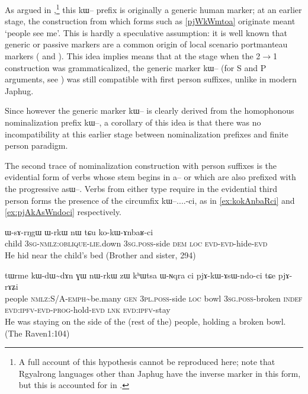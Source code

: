 \documentclass[oldfontcommands,oneside,a4paper,11pt]{article}
\newcommand{\ipa}[1]{{\phon #1}} %
\begin{document}
As argued in \citet{jacques15generic},\footnote{A full account of this hypothesis cannot be reproduced here; note that Rgyalrong languages other than Japhug have the inverse marker in this form, but this is accounted for in \citet{jacques15generic}. } this  \ipa{kɯ--} prefix is originally a generic human marker; at an earlier stage, the construction from which forms such as \ref{pjWkWmtoa} originate meant `people see me'. This is hardly a speculative assumption: it is well known that generic or passive markers are a common origin of local scenario portmanteau markers (\citealt{heath98skewing} and  \citealt{delancey15sociopragmatic}). This idea implies means that at the stage when the 2$\rightarrow$1 construction was grammaticalized,  the generic marker \ipa{kɯ--} (for S and P arguments, see \citealt{jacques12demotion}) was still compatible with first person suffixes, unlike in modern Japhug. 

Since however the generic marker \ipa{kɯ--} is clearly derived from the homophonous nominalization prefix \ipa{kɯ--}, a corollary of this idea is that there was no incompatibility at this earlier stage between nominalization prefixes and finite person paradigm.

The second trace of nominalization construction with person suffixes is the evidential form of verbs whose stem begins in \ipa{a--} or which are also prefixed with the progressive \ipa{asɯ--}. Verbs from either type require in the evidential third person forms  the presence of the circumfix \ipa{kɯ--....-ci}, as in \ref{ex:kokAnbaRci} and \ref{ex:pjAkAsWndoci} respectively.

\begin{exe}
\ex \label{ex:kokAnbaRci}
\gll \ipa{tɤpɤtso}  	\ipa{ɯ-sɤ-rŋgɯ}  	\ipa{ɯ-rkɯ}  	\ipa{nɯ}  	\ipa{tɕu}  	\ipa{ko-kɯ-ɤnbaʁ-ci}   \\
 child \textsc{3sg-nmlz:oblique-lie}.down \textsc{3sg.poss}-side \textsc{dem} \textsc{loc} \textsc{evd-evd}-hide-\textsc{evd} \\
\glt He hid near the child's bed (Brother and sister, 294)
\end{exe}

\begin{exe}
\ex \label{ex:pjAkAsWndoci}
\gll
\ipa{tɯrme} 	\ipa{kɯ-dɯ\textasciitilde{}dɤn} 	\ipa{ɣɯ} 	\ipa{nɯ-rkɯ} 	\ipa{zɯ} 	\ipa{kʰɯtsa} 	\ipa{ɯ-ɴqra} 	\ipa{ci} 	\ipa{pjɤ-kɯ-ɤsɯ-ndo-ci} 	\ipa{tɕe} 	\ipa{pjɤ-rɤʑi}  \\
people \textsc{nmlz:S/A-emph}\textasciitilde{}be.many \textsc{gen}  \textsc{3pl.poss}-side \textsc{loc} bowl \textsc{3sg.poss}-broken \textsc{indef} \textsc{evd:ipfv-evd-prog}-hold-\textsc{evd} \textsc{lnk} \textsc{evd:ipfv}-stay \\
\glt He was staying on the side of the (rest of the) people, holding a broken bowl. (The Raven1:104)
\end{exe}
\end{document}
